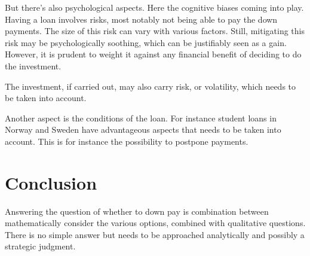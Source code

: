 \documentclass[a4paper]{article}
\begin{document}
But there's also psychological aspects. Here the cognitive biases coming into
play. Having a loan involves risks, most notably not being able to pay the
down payments. The size of this risk can vary with various factors. Still,
mitigating this risk may be psychologically soothing, which can be justifiably
seen as a gain. However, it is prudent to weight it against any financial
benefit of deciding to do the investment.

The investment, if carried out, may also carry risk, or volatility, which needs to be taken into
account.

Another aspect is the conditions of the loan. For instance student loans in
Norway and Sweden have advantageous aspects that needs to be taken into account.
This is for instance the possibility to postpone payments.

\section{Conclusion}

Answering the question of whether to down pay is combination between
mathematically consider the various options, combined with qualitative
questions. There is no simple answer but needs to be approached analytically and
possibly a strategic judgment.
\end{document}
